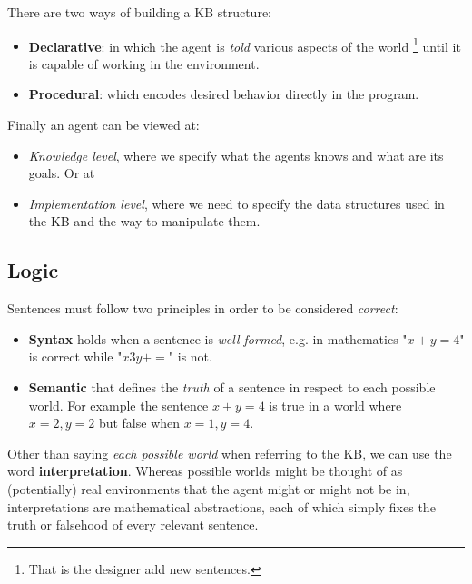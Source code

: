 \documentclass[10pt,a4paper]{article}
\begin{document}
There are two ways of building a KB structure:
\begin{itemize}
\item \textbf{Declarative}: in which the agent is \textit{told} various aspects of the world \footnote{That is the designer add new sentences.} until it is capable of working in the environment.
\item \textbf{Procedural}: which encodes desired behavior directly in the program.
\end{itemize}

Finally an agent can be viewed at:
\begin{itemize}
\item \textit{Knowledge level}, where we specify what the agents knows and what are its goals. Or at
\item \textit{Implementation level}, where we need to specify the data structures used in the KB and the way to manipulate them.
\end{itemize}

\subsection{Logic}
\label{sec:logic}
Sentences must follow two principles in order to be considered \textit{correct}:
\begin{itemize}
\item \textbf{Syntax} holds when a sentence is \textit{well formed}, e.g. in mathematics "$x+y=4$" is correct while "$x3y +=$" is not.
\item \textbf{Semantic}  that defines the \textit{truth} of a sentence in respect to each possible world. For example the sentence $x+y=4$ is true in a world where $x=2,y=2$ but false when $x=1,y=4$.
\end{itemize}

Other than saying \textit{each possible world} when referring to the KB, we can use the word \textbf{interpretation}. Whereas possible worlds might be thought of as (potentially) real environments that the agent might or might not be in, interpretations are mathematical abstractions, each of which simply fixes the truth or falsehood of every relevant sentence.\\
\end{document}
